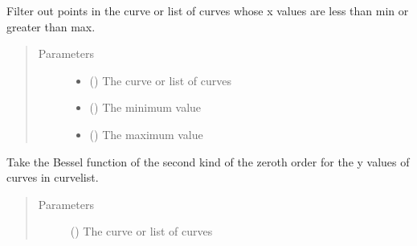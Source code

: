 \documentclass[letterpaper,10pt,english]{sphinxmanual}
\begin{document}

\begin{fulllineitems}
\label{\detokenize{pydv:pydvpy.xminmax}}
Filter out points in the curve or list of curves whose x values are
less than min or greater than max.
\begin{quote}\begin{description}
\item[{Parameters}] \leavevmode\begin{itemize}
\item {} 
 () \textendash{} The curve or list of curves

\item {} 
 () \textendash{} The minimum value

\item {} 
 () \textendash{} The maximum value

\end{itemize}

\end{description}\end{quote}

\end{fulllineitems}


\begin{fulllineitems}
\label{\detokenize{pydv:pydvpy.y0}}
Take the Bessel function of the second kind of the zeroth order for the y values of
curves in curvelist.
\begin{quote}\begin{description}
\item[{Parameters}] \leavevmode
{} () \textendash{} The curve or list of curves

\end{description}\end{quote}

\end{fulllineitems}
\end{document}
